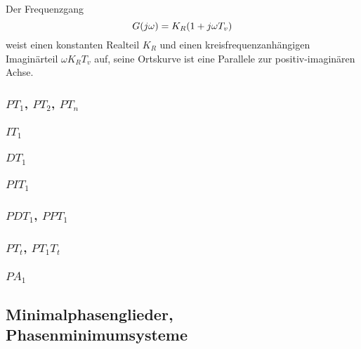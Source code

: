 Der Frequenzgang
\begin{equation}
	G\parentheses*{j\omega} = K_R\parentheses*{1 + j\omega T_v}
\end{equation}
weist einen konstanten Realteil \(K_R\) und einen kreisfrequenzanhängigen Imaginärteil \(\omega K_R T_v\) auf, seine Ortskurve ist eine Parallele zur positiv-imaginären Achse.



\subsubsection{$PT_1$, $PT_2$, $PT_n$}


\subsubsection{$IT_1$}


\subsubsection{$DT_1$}


\subsubsection{$PIT_1$}


\subsubsection{$PDT_1$, $PPT_1$}


\subsubsection{$PT_t$, $PT_1 T_t$}


\subsubsection{$PA_1$}


\subsection{Minimalphasenglieder, Phasenminimumsysteme}
